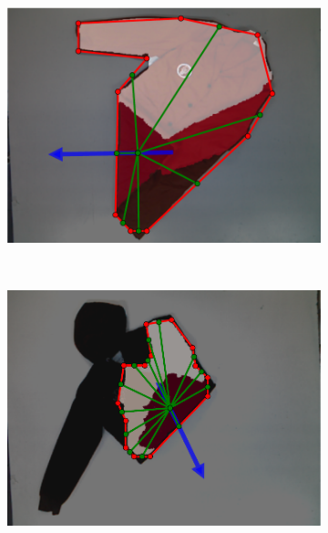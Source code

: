 \begin{figure}[htbp]
\begin{subfigure}[l]{\bigtablewidth}
    	\includegraphics[width=\textwidth]
    	{figures/results/robe15-pnp.pdf}
	\end{subfigure}
	~
    \begin{subfigure}[r]{\bigtablewidth}
	    \centering
    	\includegraphics[width=\textwidth]
    	{figures/results/hoodie14-pnp.pdf}    	
	\end{subfigure}
	~
    \begin{subfigure}[l]{\bigtablewidth}
	    \centering

\end{subfigure}
\end{figure}
